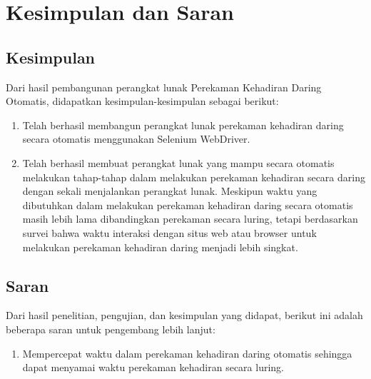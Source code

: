 \chapter{Kesimpulan dan Saran}
\label{chap:simpulandansaran}

\section{Kesimpulan}
\label{sec:kesimpulan} 
Dari hasil pembangunan perangkat lunak Perekaman Kehadiran Daring Otomatis, didapatkan kesimpulan-kesimpulan sebagai berikut:
\begin{enumerate}
	\item Telah berhasil membangun perangkat lunak perekaman kehadiran daring secara otomatis menggunakan Selenium WebDriver.
	\item Telah berhasil membuat perangkat lunak yang mampu secara otomatis melakukan tahap-tahap dalam melakukan perekaman kehadiran secara daring dengan sekali menjalankan perangkat lunak. Meskipun waktu yang dibutuhkan dalam melakukan perekaman kehadiran daring secara otomatis masih lebih lama dibandingkan perekaman secara luring, tetapi berdasarkan survei bahwa waktu interaksi dengan situs web atau browser untuk melakukan perekaman kehadiran daring menjadi lebih singkat.
\end{enumerate}

\section{Saran}
\label{sec:saran} 
Dari hasil penelitian, pengujian, dan kesimpulan yang didapat, berikut ini adalah  beberapa saran untuk pengembang lebih lanjut:
\begin{enumerate}
	\item Mempercepat waktu dalam perekaman kehadiran daring otomatis sehingga dapat menyamai waktu perekaman kehadiran secara luring.
\end{enumerate}

